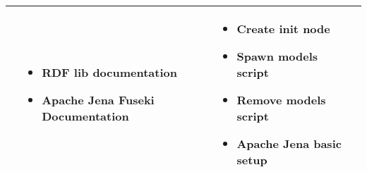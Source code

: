 \begin{center}
\begin{tabular}{ | l | p{4cm} | p{4cm} | p{5cm} |}
\begin{itemize}
     \end{itemize} 
     & \begin{itemize}
     \item RDF lib documentation
     \item Apache Jena Fuseki Documentation \cite{bib15}
     \end{itemize} 
      & \begin{itemize}
     \item Create init node
     \item Spawn models script
     \item Remove models script
     \item Apache Jena basic setup
    \end{itemize}  \\
    \hline
    \end{tabular}
\end{center}


